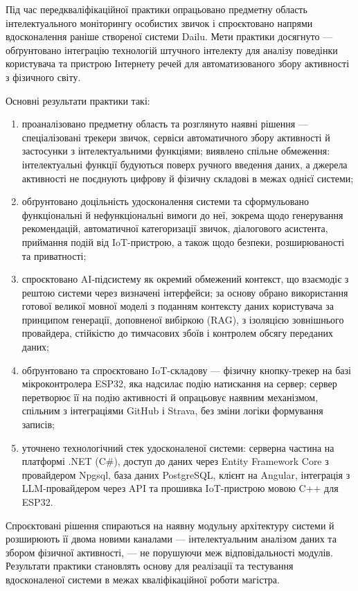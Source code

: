 
Під час передкваліфікаційної практики опрацьовано предметну область інтелектуального
моніторингу особистих звичок і спроєктовано напрями вдосконалення раніше створеної системи
Dailu.
Мети практики досягнуто — обґрунтовано інтеграцію технологій штучного інтелекту для аналізу
поведінки користувача та пристрою Інтернету речей для автоматизованого збору активності з
фізичного світу.

Основні результати практики такі:

\begin{enumerate}[noitemsep, topsep=2pt, leftmargin=*, label=\arabic*)]
    \item проаналізовано предметну область та розглянуто наявні рішення — спеціалізовані трекери звичок, сервіси автоматичного збору активності й застосунки з інтелектуальними функціями; виявлено спільне обмеження: інтелектуальні функції будуються поверх ручного введення даних, а джерела активності не поєднують цифрову й фізичну складові в межах однієї системи;
    \item обґрунтовано доцільність удосконалення системи та сформульовано функціональні й нефункціональні вимоги до неї, зокрема щодо генерування рекомендацій, автоматичної категоризації звичок, діалогового асистента, приймання подій від IoT-пристрою, а також щодо безпеки, розширюваності та приватності;
    \item спроєктовано AI-підсистему як окремий обмежений контекст, що взаємодіє з рештою системи через визначені інтерфейси; за основу обрано використання готової великої мовної моделі з поданням контексту даних користувача за принципом генерації, доповненої вибіркою (RAG), з ізоляцією зовнішнього провайдера, стійкістю до тимчасових збоїв і контролем обсягу переданих даних;
    \item обґрунтовано та спроєктовано IoT-складову — фізичну кнопку-трекер на базі мікроконтролера ESP32, яка надсилає подію натискання на сервер; сервер перетворює її на подію активності й опрацьовує наявним механізмом, спільним з інтеграціями GitHub і Strava, без зміни логіки формування записів;
    \item уточнено технологічний стек удосконаленої системи: серверна частина на платформі .NET (C\#), доступ до даних через Entity Framework Core з провайдером Npgsql, база даних PostgreSQL, клієнт на Angular, інтеграція з LLM-провайдером через API та прошивка IoT-пристрою мовою C++ для ESP32.
\end{enumerate}

Спроєктовані рішення спираються на наявну модульну архітектуру системи й розширюють її двома
новими каналами — інтелектуальним аналізом даних та збором фізичної активності, — не порушуючи
меж відповідальності модулів.
Результати практики становлять основу для реалізації та тестування вдосконаленої системи в
межах кваліфікаційної роботи магістра.
